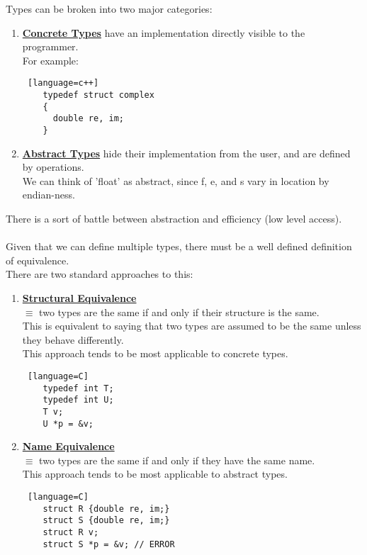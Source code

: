 \documentclass[../../lecture_notes.tex]{subfiles}
\begin{document}
Types can be broken into two major categories:
\begin{enumerate} [itemsep=0mm]
	\item \textbf{\underline{Concrete Types}} have an implementation directly visible to the programmer.\\
		For example:
			\begin{lstlisting} [language=c++]
	typedef struct complex
	{
	  double re, im;
	}
			\end{lstlisting}
	\item \textbf{\underline{Abstract Types}} hide their implementation from the user, and are defined by operations.\\
		We can think of 'float' as abstract, since f, e, and s vary in location by endian-ness.\\
\end{enumerate}
There is a sort of battle between abstraction and efficiency (low level access).\\
\\
Given that we can define multiple types, there must be a well defined definition of equivalence.\\
There are two standard approaches to this:
\begin{enumerate} [itemsep=0mm]
	\item \textbf{\underline{Structural Equivalence}}\\
		$\equiv$ two types are the same if and only if their structure is the same.\\
		This is equivalent to saying that two types are assumed to be the same unless they behave differently.\\
		This approach tends to be most applicable to concrete types.
		\begin{lstlisting} [language=C]
	typedef int T;
	typedef int U;
	T v;
	U *p = &v;
		\end{lstlisting}
	\item \textbf{\underline{Name Equivalence}}\\
		$\equiv$ two types are the same if and only if they have the same name.\\
		This approach tends to be most applicable to abstract types.
		\begin{lstlisting} [language=C]
	struct R {double re, im;}
	struct S {double re, im;}
	struct R v;
	struct S *p = &v; // ERROR
		\end{lstlisting}
\end{enumerate}
\end{document}
